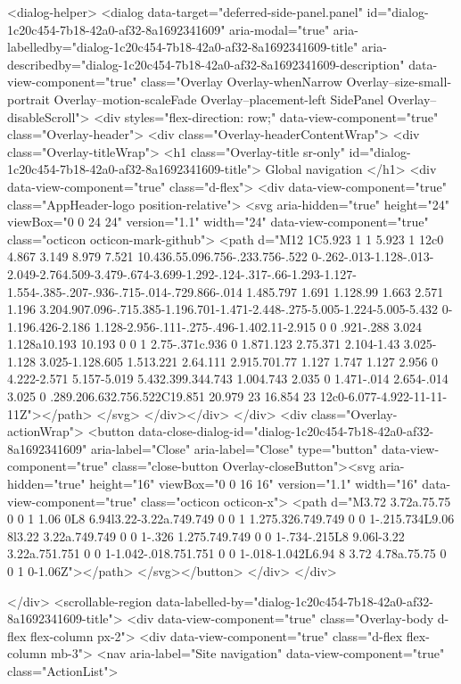 <dialog-helper>
  <dialog data-target="deferred-side-panel.panel" id="dialog-1c20c454-7b18-42a0-af32-8a1692341609" aria-modal="true" aria-labelledby="dialog-1c20c454-7b18-42a0-af32-8a1692341609-title" aria-describedby="dialog-1c20c454-7b18-42a0-af32-8a1692341609-description" data-view-component="true" class="Overlay Overlay-whenNarrow Overlay--size-small-portrait Overlay--motion-scaleFade Overlay--placement-left SidePanel Overlay--disableScroll">
    <div styles="flex-direction: row;" data-view-component="true" class="Overlay-header">
  <div class="Overlay-headerContentWrap">
    <div class="Overlay-titleWrap">
      <h1 class="Overlay-title sr-only" id="dialog-1c20c454-7b18-42a0-af32-8a1692341609-title">
        Global navigation
      </h1>
            <div data-view-component="true" class="d-flex">
      <div data-view-component="true" class="AppHeader-logo position-relative">
        <svg aria-hidden="true" height="24" viewBox="0 0 24 24" version="1.1" width="24" data-view-component="true" class="octicon octicon-mark-github">
    <path d="M12 1C5.923 1 1 5.923 1 12c0 4.867 3.149 8.979 7.521 10.436.55.096.756-.233.756-.522 0-.262-.013-1.128-.013-2.049-2.764.509-3.479-.674-3.699-1.292-.124-.317-.66-1.293-1.127-1.554-.385-.207-.936-.715-.014-.729.866-.014 1.485.797 1.691 1.128.99 1.663 2.571 1.196 3.204.907.096-.715.385-1.196.701-1.471-2.448-.275-5.005-1.224-5.005-5.432 0-1.196.426-2.186 1.128-2.956-.111-.275-.496-1.402.11-2.915 0 0 .921-.288 3.024 1.128a10.193 10.193 0 0 1 2.75-.371c.936 0 1.871.123 2.75.371 2.104-1.43 3.025-1.128 3.025-1.128.605 1.513.221 2.64.111 2.915.701.77 1.127 1.747 1.127 2.956 0 4.222-2.571 5.157-5.019 5.432.399.344.743 1.004.743 2.035 0 1.471-.014 2.654-.014 3.025 0 .289.206.632.756.522C19.851 20.979 23 16.854 23 12c0-6.077-4.922-11-11-11Z"></path>
</svg>
</div></div>
    </div>
    <div class="Overlay-actionWrap">
      <button data-close-dialog-id="dialog-1c20c454-7b18-42a0-af32-8a1692341609" aria-label="Close" aria-label="Close" type="button" data-view-component="true" class="close-button Overlay-closeButton"><svg aria-hidden="true" height="16" viewBox="0 0 16 16" version="1.1" width="16" data-view-component="true" class="octicon octicon-x">
    <path d="M3.72 3.72a.75.75 0 0 1 1.06 0L8 6.94l3.22-3.22a.749.749 0 0 1 1.275.326.749.749 0 0 1-.215.734L9.06 8l3.22 3.22a.749.749 0 0 1-.326 1.275.749.749 0 0 1-.734-.215L8 9.06l-3.22 3.22a.751.751 0 0 1-1.042-.018.751.751 0 0 1-.018-1.042L6.94 8 3.72 4.78a.75.75 0 0 1 0-1.06Z"></path>
</svg></button>
    </div>
  </div>
  
</div>
      <scrollable-region data-labelled-by="dialog-1c20c454-7b18-42a0-af32-8a1692341609-title">
        <div data-view-component="true" class="Overlay-body d-flex flex-column px-2">    <div data-view-component="true" class="d-flex flex-column mb-3">
        <nav aria-label="Site navigation" data-view-component="true" class="ActionList">
  
